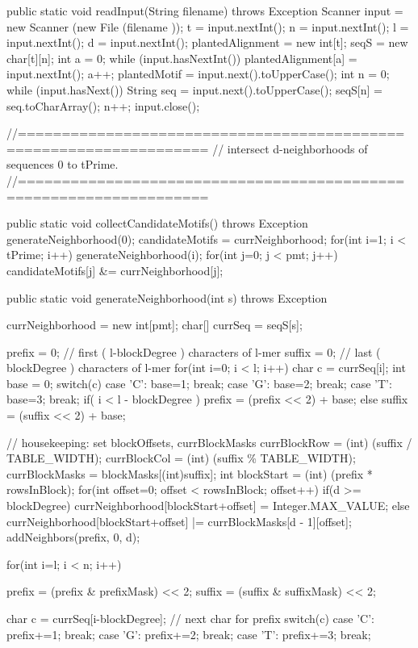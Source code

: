\documentclass[oneside,12pt]{DISCSthesis}
\begin{document}
{\begin{footnotesize}
\begin{verbatimtab}[2]
{{{{			}
		}
	}

	public static void readInput(String filename) throws Exception {
		Scanner input = new Scanner (new File (filename ));
		t = input.nextInt();		
		n = input.nextInt();		
		l = input.nextInt();
		d = input.nextInt();
		plantedAlignment = new int[t];
		seqS = new char[t][n];
		int a = 0;
		while (input.hasNextInt()) {	
			plantedAlignment[a] = input.nextInt();
			a++;
		}		
		plantedMotif = input.next().toUpperCase();
		int n = 0;
		while (input.hasNext()) {
			String seq = input.next().toUpperCase();
			seqS[n] = seq.toCharArray();
			n++;
		}
		input.close();
	}

//===================================================================
// intersect d-neighborhoods of sequences 0 to tPrime.
//===================================================================

	public static void collectCandidateMotifs() throws Exception {
		generateNeighborhood(0);		
		candidateMotifs = currNeighborhood;
		for(int i=1; i < tPrime; i++) {
			generateNeighborhood(i);
			for(int j=0; j < pmt; j++)
				candidateMotifs[j] &= currNeighborhood[j];
		}
	}

	public static void generateNeighborhood(int s) throws Exception {
		currNeighborhood = new int[pmt];
		char[] currSeq = seqS[s];

		prefix = 0; 	// first ( l-blockDegree ) characters of l-mer
		suffix = 0;  	// last  (  blockDegree  ) characters of l-mer
		for(int i=0; i < l; i++) {
			char c = currSeq[i];
			int base = 0;
			switch(c) {
				case 'C': base=1; break;
				case 'G': base=2; break;
				case 'T': base=3; break;
			}
			if( i < l - blockDegree )
				prefix = (prefix << 2) + base;
			else
				suffix = (suffix << 2) + base;
		}

		// housekeeping: set blockOffsets, currBlockMasks
		currBlockRow = (int) (suffix / TABLE_WIDTH);
		currBlockCol = (int) (suffix \% TABLE_WIDTH);
		currBlockMasks = blockMasks[(int)suffix];
		int blockStart = (int) (prefix * rowsInBlock);
		for(int offset=0; offset < rowsInBlock; offset++) {
			if(d >= blockDegree)
				currNeighborhood[blockStart+offset] = Integer.MAX_VALUE;
			else
				currNeighborhood[blockStart+offset] |= currBlockMasks[d - 1][offset];
		}
		addNeighbors(prefix, 0, d);
		
		for(int i=l; i < n; i++) {			
			prefix = (prefix & prefixMask) << 2;
			suffix = (suffix & suffixMask) << 2;

			char c = currSeq[i-blockDegree]; 	// next char for prefix
			switch(c) {
				case 'C': prefix+=1; break;
				case 'G': prefix+=2; break;
				case 'T': prefix+=3; break;
			}

}}}
\end{verbatimtab}
\end{footnotesize}}
\end{document}
